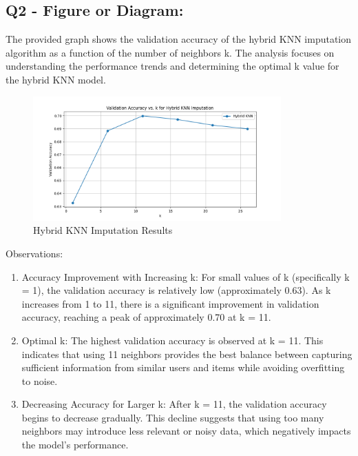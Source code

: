 \documentclass{article}
\begin{document}
\subsection*{Q2 - Figure or Diagram:}
The provided graph shows the validation accuracy of the hybrid KNN imputation algorithm as a function of the number of neighbors k. The analysis focuses on understanding the performance trends and determining the optimal k value for the hybrid KNN model.
\begin{figure}[H]
    \centering
    \includegraphics[width=0.85\textwidth]{bl2.png}
    \caption{Hybrid KNN Imputation Results}
\end{figure}
Observations:
\begin{enumerate}
    \item Accuracy Improvement with Increasing k:
    For small values of k (specifically k = 1), the validation accuracy is relatively low (approximately 0.63).
    As k increases from 1 to 11, there is a significant improvement in validation accuracy, reaching a peak of approximately 0.70 at k = 11.
    \item Optimal k:
    The highest validation accuracy is observed at k = 11. This indicates that using 11 neighbors provides the best balance between capturing sufficient information from similar users and items while avoiding overfitting to noise.
    \item Decreasing Accuracy for Larger k:
    After k = 11, the validation accuracy begins to decrease gradually. This decline suggests that using too many neighbors may introduce less relevant or noisy data, which negatively impacts the model's performance.
\end{enumerate}
\end{document}
